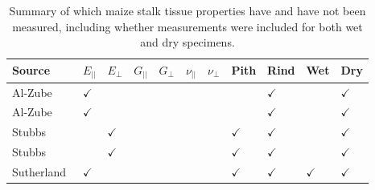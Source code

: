 \begin{table}[htbp]
    \centering
    \caption[Summary of which maize stalk tissue properties have and have not been measured.]{Summary of which maize stalk tissue properties have and have not been measured, including whether measurements were included for both wet and dry specimens.}
    \label{tab:measured_properties}    
    \renewcommand{\arraystretch}{1.5} %

    \begin{tabular}{|>{\centering\arraybackslash}p{2.5cm}|>{\centering\arraybackslash}p{0.35cm}|>{\centering\arraybackslash}p{0.35cm}|>{\centering\arraybackslash}p{0.35cm}|>{\centering\arraybackslash}p{0.35cm}|>{\centering\arraybackslash}p{0.35cm}|>{\centering\arraybackslash}p{0.35cm}|>{\centering\arraybackslash}p{0.65cm}|>{\centering\arraybackslash}p{0.75cm}|>{\centering\arraybackslash}p{0.65cm}|>{\centering\arraybackslash}p{0.65cm}|}
        \hline
        \textbf{Source} & \textbf{${E_{||}}$} & \textbf{${E_{\perp}}$} & \textbf{${G_{||}}$} & \textbf{${G_{\perp}}$} & \textbf{${\nu_{||}}$} & \textbf{${\nu_{\perp}}$} & \textbf{Pith} & \textbf{Rind} & \textbf{Wet} & \textbf{Dry} \\
        \hline
        Al-Zube~\protect\cite{al-zube_measuring_2017} & ${\checkmark}$ & & & & & & & ${\checkmark}$ & & ${\checkmark}$ \\
        \hline
        Al-Zube~\protect\cite{al-zube_elastic_2018} & ${\checkmark}$ & & & & & & & ${\checkmark}$ & & ${\checkmark}$ \\
        \hline
        Stubbs~\protect\cite{stubbs_measuring_2019} & & ${\checkmark}$ & & & & & ${\checkmark}$ & ${\checkmark}$ & & ${\checkmark}$ \\
        \hline
        Stubbs~\protect\cite{stubbs_mapping_2020} & & ${\checkmark}$ & & & & & ${\checkmark}$ & ${\checkmark}$ & & ${\checkmark}$ \\
        \hline
        Sutherland~\protect\cite{sutherland_influence_2022} & ${\checkmark}$ & & & & & & ${\checkmark}$ & ${\checkmark}$ & ${\checkmark}$ & ${\checkmark}$ \\

\end{tabular}
\end{table}
